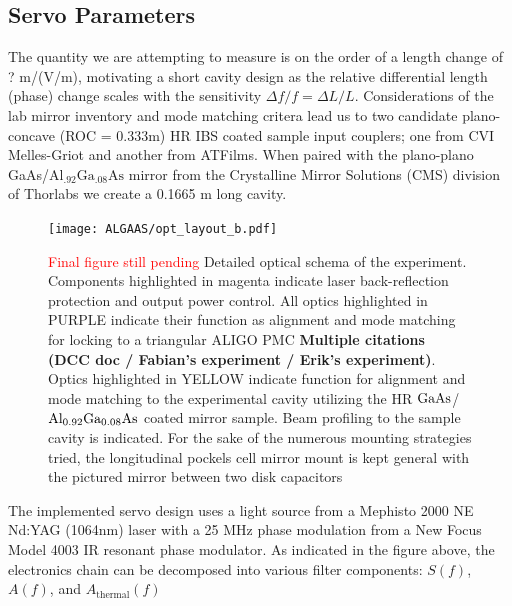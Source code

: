 \subsection{Servo Parameters}
The quantity we are attempting to measure is on the order of a length change of ? m/(V/m), motivating a short cavity design as the relative differential length (phase) change scales with the sensitivity $\Delta f / f = \Delta L / L$. Considerations of the lab mirror inventory and mode matching critera lead us to two candidate plano-concave (ROC = 0.333m) HR IBS coated sample input couplers; one from CVI Melles-Griot and another from ATFilms. When paired with the plano-plano GaAs/$\mathrm{Al_{.92}Ga_{.08}As}$  mirror from the Crystalline Mirror Solutions (CMS) division of Thorlabs we create a 0.1665 m long cavity.


\begin{figure}[H]
\begin{center}
\texttt{[image: ALGAAS/opt\_layout\_b.pdf]}
\end{center}
\caption{\textcolor{red}{Final figure still pending} Detailed optical schema of the experiment. Components highlighted in magenta indicate laser back-reflection protection and output power control. All optics highlighted in PURPLE indicate their function as alignment and mode matching for locking to a triangular ALIGO PMC \textbf{Multiple citations (DCC doc / Fabian's experiment / Erik's experiment)}. Optics highlighted in YELLOW indicate function for alignment and mode matching to the experimental cavity utilizing the HR $\mathrm{GaAs}$/$\mathrm{Al_{0.92}Ga_{0.08}As}$ coated mirror sample. Beam profiling to the sample cavity is indicated. For the sake of the numerous mounting strategies tried, the longitudinal pockels cell mirror mount is kept general with the pictured mirror between two disk capacitors}
\label{fig:detailed_optical_layout}
\end{figure}
The implemented servo design uses a light source from a Mephisto 2000 NE Nd:YAG (1064nm) laser with a 25 MHz phase modulation from a New Focus Model 4003 IR resonant phase modulator. As indicated in the figure above, the electronics chain can be decomposed into various filter components: $S(f)$, $A(f)$, and $A_\mathrm{thermal}(f)$

